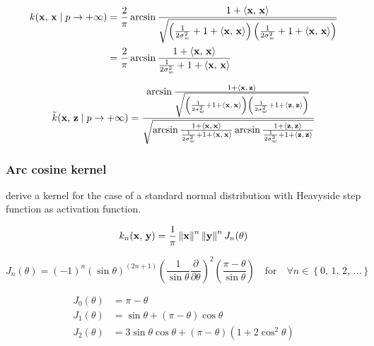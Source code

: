 \begin{align*}\label{eq:kernel_asin_xx}
	k(\mathbf{x},\,\mathbf{x} \mid p \to + \infty)
	 & = \frac{2}{\pi}
	\arcsin \frac{1 + \left\langle \mathbf{x},\,\mathbf{x} \right\rangle}{\sqrt{
			\left(
			\frac{1}{2\sigma_w^2} + 1 + \left\langle \mathbf{x},\,\mathbf{x} \right\rangle
			\right)
			\left(
			\frac{1}{2\sigma_w^2} + 1 + \left\langle \mathbf{x},\,\mathbf{x} \right\rangle
			\right)
	}}                 \\
	 & = \frac{2}{\pi}
	\arcsin \frac{1 + \left\langle \mathbf{x},\,\mathbf{x} \right\rangle}{
		\frac{1}{2\sigma_w^2} + 1 + \left\langle \mathbf{x},\,\mathbf{x} \right\rangle
	}                  \\
\end{align*}

\begin{equation}
	\tilde{k}(\mathbf{x},\,\mathbf{z} \mid p \to + \infty) =
	\frac{
		\arcsin \frac{1 + \left\langle \mathbf{x},\,\mathbf{z} \right\rangle}{\sqrt{
				\left(
				\frac{1}{2\sigma_w^2} + 1 + \left\langle \mathbf{x},\,\mathbf{x} \right\rangle
				\right)
				\left(
				\frac{1}{2\sigma_w^2} + 1 + \left\langle \mathbf{z},\,\mathbf{z} \right\rangle
				\right)
			}}
	}{
		\sqrt{
			\arcsin \frac{1 + \left\langle \mathbf{x},\,\mathbf{x} \right\rangle}{
				\frac{1}{2\sigma_w^2} + 1 + \left\langle \mathbf{x},\,\mathbf{x} \right\rangle
			}
			\arcsin \frac{1 + \left\langle \mathbf{z},\,\mathbf{z} \right\rangle}{
				\frac{1}{2\sigma_w^2} + 1 + \left\langle \mathbf{z},\,\mathbf{z} \right\rangle
			}
		}
	}
\end{equation}

\subsubsection{Arc cosine kernel}

\Textcite{choLargemarginClassificationInfinite2010} derive a kernel for the case of a standard normal
distribution with Heavyside step function as activation function.

\begin{equation}\label{eq:kernel_cho}
	k_n(\mathbf{x},\,\mathbf{y}) = \frac{1}{\pi} \left\lVert \mathbf{x} \right\rVert^n \left\lVert \mathbf{y} \right\rVert^n J_n(\theta)
\end{equation}

\begin{equation}
	J_n(\theta) = (-1)^n \left( \sin \theta \right)^{(2n+1)}
	\left( \frac{1}{\sin \theta} \frac{\partial}{\partial \theta} \right)^2
	\left( \frac{\pi - \theta}{\sin \theta} \right)
	\quad \text{for} \quad \forall n \in \left\{ 0,\,1,\,2,\,\dots \right\}
\end{equation}

\begin{align}
	J_0(\theta) & = \pi - \theta                                                                    \\
	J_1(\theta) & = \sin\theta + \left(\pi - \theta\right)\cos\theta                                \\
	J_2(\theta) & = 3\sin\theta\cos\theta + \left(\pi - \theta\right)\left(1 + 2\cos^2\theta\right)
\end{align}

